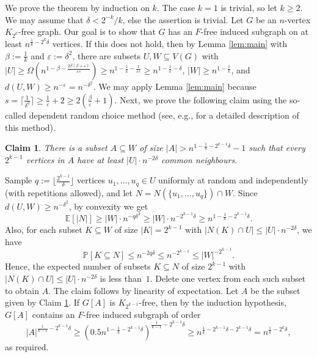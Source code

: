 \documentclass[11pt]{article}
\let\oldendproof\endproof
\renewenvironment{proof}[1][\proofname]{\oldproof[\bf #1]}{\oldendproof}
\theoremstyle{plain}
\newtheorem{claim}[theorem]{Claim}
\theoremstyle{definition}
\begin{document}
	\begin{proof}[Proof of Theorem \ref{thm:clique vs Ktt}] 
        We prove the theorem by induction on $k$. The case $k=1$ is trivial, so let $k \geq 2$. 
        We may assume that $\delta < 2^{-k}/k$, else the assertion is trivial. 
        Let $G$ be an $n$-vertex $K_{2^k}$-free graph. Our goal is to show that $G$ has an $F$-free induced subgraph on at least $n^{\frac{1}{k} - 2^k\delta}$ vertices. 
		If this does not hold, then by Lemma \ref{lem:main} with $\beta := \frac{1}{k}$ and $\varepsilon := \delta^2$, there are subsets $U,W \subseteq V(G)$ with $|U| \geq \Omega(n^{1-\beta - \frac{2\beta(\beta+\varepsilon)}{\varepsilon s}}) \geq n^{1-\frac{1}{k} - \frac{1}{\varepsilon s}} \geq n^{1 - \frac{1}{k} - \delta}$, $|W| \geq n^{1-\frac{1}{k}}$, and $d(U,W) \geq n^{-\varepsilon} = n^{-\delta^2}$. 
        We may apply Lemma \ref{lem:main} because $s = \lceil \frac{1}{\delta^3} \rceil \geq \frac{1}{\varepsilon} + 2 \geq 2(\frac{\beta}{\varepsilon} + 1)$.
        Next, we prove the following claim using the so-called dependent random choice method (see, e.g., \cite{FoxSudakov} for a detailed description of this method). 
        
		\begin{claim}\label{claim:DRC}
			There is a subset $A \subseteq W$ of size $|A| > n^{1-\frac{1}{k} - 2^{k-1}\delta} - 1$ such that every $2^{k-1}$ vertices in $A$ have at least $|U| \cdot n^{-2\delta}$ common neighbours.
		\end{claim}
		\begin{proof}
			Sample 
			$q := \lfloor \frac{2^{k-1}}{\delta} \rfloor$ vertices 
			$u_1,\dots,u_q \in U$ uniformly at random and independently (with repetitions allowed), and let $N = N(\{u_1,\dots,u_q\}) \cap W$. Since $d(U,W) \geq n^{-\delta^2}$, by convexity we get
			$$
			\mathbb{E}[|N|] \geq |W| \cdot n^{-q\delta^2} \geq |W| \cdot n^{-2^{k-1}\delta} \geq
			n^{1-\frac{1}{k} - 2^{k-1}\delta}.
			$$
			Also, for each subset $K \subseteq W$ of size $|K| = 2^{k-1}$ with $|N(K) \cap U| \leq |U| \cdot n^{-2\delta}$, we have 
			$$
			\mathbb{P}[K \subseteq N] \leq n^{-2q\delta} \leq n^{-2^{k-1}} \leq |W|^{-2^{k-1}}.
			$$
			Hence, the expected number of subsets $K \subseteq N$ of size $2^{k-1}$ with $|N(K) \cap U| \leq |U| \cdot n^{-2\delta}$ is less than~$1$. 
            Delete one vertex from each such subset to obtain $A$.
            The claim follows by linearity \nolinebreak of \nolinebreak expectation. 
		\end{proof}
		Let $A$ be the subset given by Claim \ref{claim:DRC}. If $G[A]$ is $K_{2^{k-1}}$-free, then by the induction hypothesis, $G[A]$ contains an $F$-free induced subgraph of order
		$$
		|A|^{\frac{1}{k-1} - 2^{k-1}\delta} \geq \left( 0.5n^{1 - \frac{1}{k} - 2^{k-1}\delta} \right)^{\frac{1}{k-1} - 2^{k-1}\delta} \geq 
		n^{\frac{1}{k} - 2^{k-1} \delta - 2^{k-1}\delta} = n^{\frac{1}{k} - 2^k\delta},
		$$ 
		as required. 
		

\end{proof}
\end{document}

